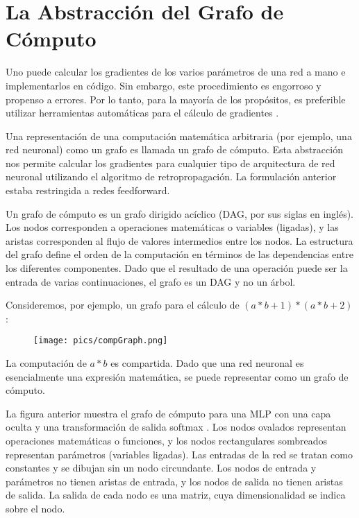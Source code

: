 \section{La Abstracción del Grafo de Cómputo}
Uno puede calcular los gradientes de los varios parámetros de una red a mano e implementarlos en código. Sin embargo, este procedimiento es engorroso y propenso a errores. Por lo tanto, para la mayoría de los propósitos, es preferible utilizar herramientas automáticas para el cálculo de gradientes \cite{bengio2012practical}.

Una representación de una computación matemática arbitraria (por ejemplo, una red neuronal) como un grafo es llamada un grafo de cómputo. Esta abstracción nos permite calcular los gradientes para cualquier tipo de arquitectura de red neuronal utilizando el algoritmo de retropropagación. La formulación anterior estaba restringida a redes feedforward.

Un grafo de cómputo es un grafo dirigido acíclico (DAG, por sus siglas en inglés). Los nodos corresponden a operaciones matemáticas o variables (ligadas), y las aristas corresponden al flujo de valores intermedios entre los nodos. La estructura del grafo define el orden de la computación en términos de las dependencias entre los diferentes componentes. Dado que el resultado de una operación puede ser la entrada de varias continuaciones, el grafo es un DAG y no un árbol.

Consideremos, por ejemplo, un grafo para el cálculo de $(a*b+1)*(a*b+2)$:

\begin{figure}[htb]
	\centering
	 \texttt{[image: pics/compGraph.png]}
\end{figure}

La computación de $a*b$ es compartida. Dado que una red neuronal es esencialmente una expresión matemática, se puede representar como un grafo de cómputo.

La figura anterior muestra el grafo de cómputo para una MLP con una capa oculta y una transformación de salida softmax \cite{goldberg2017neural}. Los nodos ovalados representan operaciones matemáticas o funciones, y los nodos rectangulares sombreados representan parámetros (variables ligadas). Las entradas de la red se tratan como constantes y se dibujan sin un nodo circundante. Los nodos de entrada y parámetros no tienen aristas de entrada, y los nodos de salida no tienen aristas de salida. La salida de cada nodo es una matriz, cuya dimensionalidad se indica sobre el nodo.

